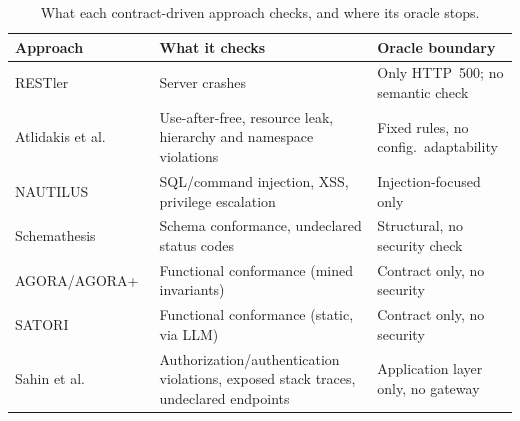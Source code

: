 \begin{table}
  \small
  \caption{What each contract-driven approach checks, and where its oracle stops.}
  \label{tab:related}
  \begin{tabular}{l p{} p{}}
    \toprule
    \textbf{Approach}                                                                           & \textbf{What it checks}                                                             & \textbf{Oracle boundary}              \\
    \midrule
    RESTler~\cite{atlidakisRESTlerStatefulREST2019a}                                            & Server crashes                                                                      & Only HTTP~500; no semantic check      \\
    Atlidakis et al.~\cite{atlidakisCheckingSecurityProperties2020}                             & Use-after-free, resource leak, hierarchy and namespace violations                   & Fixed rules, no config.\ adaptability \\
    NAUTILUS~\cite{dengNAUTILUSAutomatedRESTful2023}                                            & SQL/command injection, XSS, privilege escalation                                    & Injection-focused only                \\
    Schemathesis~\cite{schemathesisDerivingSemanticsawareFuzzers2022}                           & Schema conformance, undeclared status codes                                         & Structural, no security check         \\
    AGORA/AGORA+~\cite{alonsoAGORAAutomatedGeneration2023,alonsoAgora+TestOracleGeneration2025} & Functional conformance (mined invariants)                                           & Contract only, no security            \\
    SATORI~\cite{alonsoSATORIStaticTest2025}                                                    & Functional conformance (static, via LLM)                                            & Contract only, no security            \\
    Sahin et al.~\cite{sahinEnhancingRESTAPI2026}                                               & Authorization/authentication violations, exposed stack traces, undeclared endpoints & Application layer only, no gateway    \\
    \bottomrule
  \end{tabular}
\end{table}

